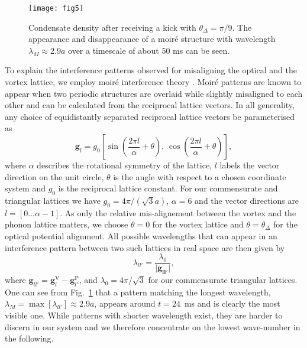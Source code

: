     			\begin{figure}[bt]
    			\texttt{[image: fig5]}
    			\caption{Condensate density after receiving a kick with $\theta_\Delta=\pi/9$. The appearance and disappearance of a moir\'e structure with wavelength $\lambda_M \approx 2.9 a$ over a timescale of about $50$ ms can be seen.}
    			\label{fig:dtheta20_ev}
    		\end{figure}

    To explain the interference patterns observed for misaligning the optical and the vortex lattice, we employ moir\'e interference theory \cite{SS:Kerman_jphyscon_2012}. Moir\'e patterns are known to appear when two periodic structures are overlaid while slightly misaligned to each other and can be calculated from the reciprocal lattice vectors. In all generality, any choice of equidistantly separated reciprocal lattice vectors be parameterised as
    	\begin{equation}
    		\mathbf{g}_{l} = g_0 \left[ \sin\left( \frac{2\pi l}{\alpha}+\theta \right),\, \cos\left( \frac{2\pi l}{\alpha} +\theta\right) \right],
    	\end{equation}
    where $\alpha$ describes the rotational symmetry of the lattice, $l$ labels the vector direction on the unit circle, $\theta$ is the angle with respect to a chosen coordinate system and $g_0$ is the reciprocal lattice constant. For our commensurate and triangular lattices we have $g_0=4\pi/(\sqrt{3}a)$, $\alpha=6$ and the vector directions are $l=\left[0\dots\alpha-1\right]$. As only the relative mis-alignement between the vortex and the phonon lattice matters, we choose $\theta=0$ for the vortex lattice and $\theta=\theta_\Delta$ for the optical potential alignment.
    	All possible wavelengths that can appear in an interference pattern between two such lattices in real space are then given by
    	\begin{equation}
    		\lambda_{ll'} = \frac{\lambda_0}{|\mathbf{\mathbf{g}_{ll'}|}},
    		\label{eq:InterferenceVectors}
    	\end{equation}
    	where
    	$\mathbf{g}_{ll'}=\mathbf{g}_{l}^{\text{V}}-\mathbf{g}_{l'}^{\text{P}}$, and
    	$\lambda_0 = 4\pi/\sqrt{3}$ for our commensurate triangular lattices.
    One can see from Fig.~\ref{fig:dtheta20_ev} that a pattern matching the longest wavelength, $\lambda_M= \max[\lambda_{ll'}] \approx 2.9 a$, appears around $t=24$~ms and is clearly the most visible one. While patterns with shorter wavelength exist, they are harder to discern in our system and we therefore concentrate on the lowest wave-number in the following.

